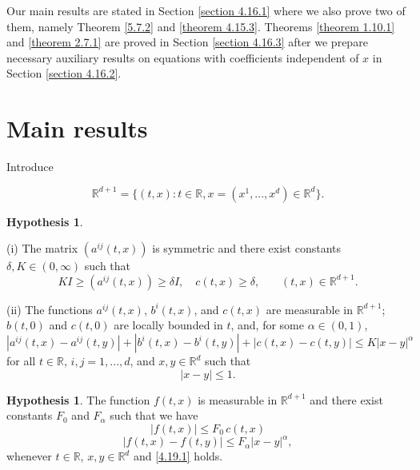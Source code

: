 \documentclass[reqno,12pt]{amsart}
\theoremstyle{definition}
\newtheorem{hypothesis}[theorem]{Hypothesis}
\theoremstyle{remark}
\begin{document}
Our main results are stated in Section \ref{section 4.16.1} where
we also prove two of them, namely Theorem \ref{5.7.2} and
\ref{theorem 4.15.3}. Theorems \ref{theorem 1.10.1} and
\ref{theorem 2.7.1} are proved in Section \ref{section 4.16.3}
after we prepare necessary auxiliary results on equations with
coefficients independent of $x$ in Section \ref{section 4.16.2}.

{\section{{Main results}}
\setcounter{equation}{0}}
                                           \label{section 4.16.1}

Introduce

$$
{\mathbb{R}}^{d+1}=\{(t,x):t\in{\mathbb{R}},x=(x^{1},...,x^{d})\in{\mathbb{R}}^{d}\}.
$$

\begin{hypothesis}                              \label{hy}

(i) The matrix $(a^{ij}(t,x))$ is symmetric and there exist
constants $\delta,K\in(0,\infty)$ such that
$$
KI \geq(a^{ij}(t,x))\geq\delta I , \quad c(t,x)\geq\delta,\quad
\;\;\; (t,x) \in{\mathbb{R}}^{d+1} .
$$

(ii) The functions $a^{ij}(t,x)$, $b^i(t,x)$, and $c(t,x)$  are
measurable in ${\mathbb{R}}^{d+1} $; $b(t,0)$ and $c(t,0)$ are  locally
bounded in $t$, and, for some $\alpha \in (0,1)$,
$$
|a^{ij}(t,x)-a^{ij}(t,y)| +
   |b^i(t,x)-b^i(t,y)
|+ |c(t,x)-c(t,y)|\leq K|x-y|^{\alpha}
$$
for all $t \in{\mathbb{R}} $, $i,j=1,...,d$, and $x,y\in{\mathbb{R}}^{d}$ such that
\begin{equation}
                                                  \label{4.19.1}
|x-y|\leq1.
\end{equation}
\end{hypothesis}

\begin{hypothesis}                              \label{H2}
The function $f(t,x)$
   is measurable in
   ${\mathbb{R}}^{d+1} $   and there exist
    constants $F_{0}$ and $F_{\alpha}$
   such that we have
\begin{equation}
                                                  \label{5.7.3}
|f(t,x)|\leq F_{0}\, c(t,x)
\end{equation}
$$
|f(t,x)-f(t,y)|\leq F_{\alpha}|x-y|^{\alpha},
$$
whenever $t\in{\mathbb{R}}$, $x,y\in{\mathbb{R}}^{d}$  and \eqref{4.19.1} holds.
\end{hypothesis}
\end{document}
